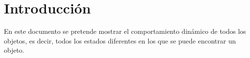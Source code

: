 \section{Introducción}\label{sec:intro}

\begin{flushleft}
En este documento se pretende mostrar el comportamiento dinámico de todos los objetos, es decir, todos los estados diferentes en los que se puede encontrar un objeto.
\end{flushleft}
